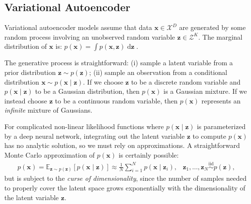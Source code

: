 \subsection{Variational Autoencoder}
%
Variational autoencoder models assume that data $\mathbf{x} \in \mathcal{X}^D$ are generated by some random process involving an unobserved random variable $\mathbf{z} \in \mathcal{Z}^K$. The marginal distribution of $\mathbf{x}$ is: $p(\mathbf{x}) = \int p(\mathbf{x}, \mathbf{z})\mathop{\mathrm{d}\mathbf{z}}$. 

The generative process is straightforward: (i) sample a latent variable from a prior distribution $\mathbf{z} \sim p(\mathbf{z})$; (ii) sample an observation from a conditional distribution $\mathbf{x}\sim p(\mathbf{x} \mid \mathbf{z})$. If we choose $\mathbf{z}$ to be a discrete random variable and $p(\mathbf{x} \mid \mathbf{z})$ to be a Gaussian distribution, then $p(\mathbf{x})$ is a Gaussian mixture. If we instead choose $\mathbf{z}$ to be a continuous random variable, then $p(\mathbf{x})$ represents an \textit{infinite} mixture of Gaussians.

For complicated non-linear likelihood functions where $p(\mathbf{x} \mid \mathbf{z})$ is parameterized by a deep neural network, integrating out the latent variable $\mathbf{z}$ to compute $p(\mathbf{x})$ has no analytic solution, so we must rely on approximations. A straightforward Monte Carlo approximation of $p(\mathbf{x})$ is certainly possible: 
%
\begin{align}
&p(\mathbf{x}) = \mathbb{E}_{\mathbf{z} \sim p(\mathbf{z})} \left[p(\mathbf{x} \mid \mathbf{z})\right] \approx
\frac{1}{N}\sum_{i=1}^N p(\mathbf{x} \mid \mathbf{z}_i), &\mathbf{z}_1,\dots,\mathbf{z}_N \mathop{\sim}\limits^{\mathrm{iid}} p(\mathbf{z}), &
\end{align}
%
but is subject to the \textit{curse of dimensionality}, since the number of samples needed to properly cover the latent space grows exponentially with the dimensionality of the latent variable $\mathbf{z}$.


